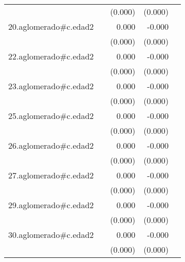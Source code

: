 {\begin{longtable}{l*{4}{D{.}{.}{-1}}}
            &                     &     (0.000)         &     (0.000)         &                     \\
\addlinespace
20.aglomerado#c.edad2&                     &       0.000         &      -0.000         &                     \\
            &                     &     (0.000)         &     (0.000)         &                     \\
\addlinespace
22.aglomerado#c.edad2&                     &       0.000         &      -0.000         &                     \\
            &                     &     (0.000)         &     (0.000)         &                     \\
\addlinespace
23.aglomerado#c.edad2&                     &       0.000         &      -0.000         &                     \\
            &                     &     (0.000)         &     (0.000)         &                     \\
\addlinespace
25.aglomerado#c.edad2&                     &       0.000         &      -0.000         &                     \\
            &                     &     (0.000)         &     (0.000)         &                     \\
\addlinespace
26.aglomerado#c.edad2&                     &       0.000         &      -0.000         &                     \\
            &                     &     (0.000)         &     (0.000)         &                     \\
\addlinespace
27.aglomerado#c.edad2&                     &       0.000         &      -0.000         &                     \\
            &                     &     (0.000)         &     (0.000)         &                     \\
\addlinespace
29.aglomerado#c.edad2&                     &       0.000         &      -0.000         &                     \\
            &                     &     (0.000)         &     (0.000)         &                     \\
\addlinespace
30.aglomerado#c.edad2&                     &       0.000         &      -0.000         &                     \\
            &                     &     (0.000)         &     (0.000)         &                     \\

\end{longtable}}
